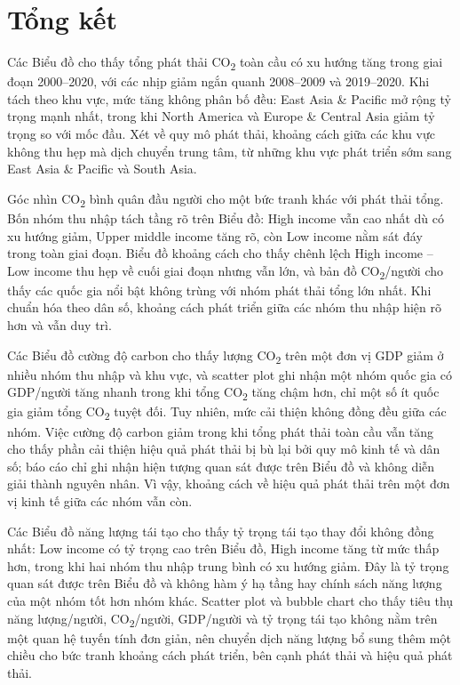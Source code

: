 \section{Tổng kết}

Các Biểu đồ cho thấy tổng phát thải CO\textsubscript{2} toàn cầu có xu hướng tăng trong giai đoạn 2000--2020, với các nhịp giảm ngắn quanh 2008--2009 và 2019--2020. Khi tách theo khu vực, mức tăng không phân bố đều: East Asia \& Pacific mở rộng tỷ trọng mạnh nhất, trong khi North America và Europe \& Central Asia giảm tỷ trọng so với mốc đầu. Xét về quy mô phát thải, khoảng cách giữa các khu vực không thu hẹp mà dịch chuyển trung tâm, từ những khu vực phát triển sớm sang East Asia \& Pacific và South Asia.


Góc nhìn CO\textsubscript{2} bình quân đầu người cho một bức tranh khác với phát thải tổng. Bốn nhóm thu nhập tách tầng rõ trên Biểu đồ: High income vẫn cao nhất dù có xu hướng giảm, Upper middle income tăng rõ, còn Low income nằm sát đáy trong toàn giai đoạn. Biểu đồ khoảng cách cho thấy chênh lệch High income -- Low income thu hẹp về cuối giai đoạn nhưng vẫn lớn, và bản đồ CO\textsubscript{2}/người cho thấy các quốc gia nổi bật không trùng với nhóm phát thải tổng lớn nhất. Khi chuẩn hóa theo dân số, khoảng cách phát triển giữa các nhóm thu nhập hiện rõ hơn và vẫn duy trì.


Các Biểu đồ cường độ carbon cho thấy lượng CO\textsubscript{2} trên một đơn vị GDP giảm ở nhiều nhóm thu nhập và khu vực, và scatter plot ghi nhận một nhóm quốc gia có GDP/người tăng nhanh trong khi tổng CO\textsubscript{2} tăng chậm hơn, chỉ một số ít quốc gia giảm tổng CO\textsubscript{2} tuyệt đối. Tuy nhiên, mức cải thiện không đồng đều giữa các nhóm. Việc cường độ carbon giảm trong khi tổng phát thải toàn cầu vẫn tăng cho thấy phần cải thiện hiệu quả phát thải bị bù lại bởi quy mô kinh tế và dân số; báo cáo chỉ ghi nhận hiện tượng quan sát được trên Biểu đồ và không diễn giải thành nguyên nhân. Vì vậy, khoảng cách về hiệu quả phát thải trên một đơn vị kinh tế giữa các nhóm vẫn còn.


Các Biểu đồ năng lượng tái tạo cho thấy tỷ trọng tái tạo thay đổi không đồng nhất: Low income có tỷ trọng cao trên Biểu đồ, High income tăng từ mức thấp hơn, trong khi hai nhóm thu nhập trung bình có xu hướng giảm. Đây là tỷ trọng quan sát được trên Biểu đồ và không hàm ý hạ tầng hay chính sách năng lượng của một nhóm tốt hơn nhóm khác. Scatter plot và bubble chart cho thấy tiêu thụ năng lượng/người, CO\textsubscript{2}/người, GDP/người và tỷ trọng tái tạo không nằm trên một quan hệ tuyến tính đơn giản, nên chuyển dịch năng lượng bổ sung thêm một chiều cho bức tranh khoảng cách phát triển, bên cạnh phát thải và hiệu quả phát thải.


